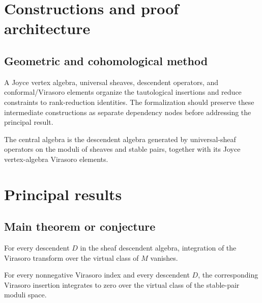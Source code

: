 \chapter{Constructions and proof architecture}
\label{chap:virasoro-constraints-moduli-sheaves-vertex-algebras-method}

\section{Geometric and cohomological method}
\label{sec:virasoro-constraints-moduli-sheaves-vertex-algebras-method}

A Joyce vertex algebra, universal sheaves, descendent operators, and conformal/Virasoro elements organize the tautological insertions and reduce constraints to rank-reduction identities. The formalization should preserve these intermediate constructions
as separate dependency nodes before addressing the principal result.

\begin{definition}
\label{virasoro-constraints-moduli-sheaves-vertex-algebras-central-object}
The central algebra is the descendent algebra generated by universal-sheaf operators on the moduli of sheaves and stable pairs, together with its Joyce vertex-algebra Virasoro elements.
\notready
\end{definition}

\chapter{Principal results}
\label{chap:virasoro-constraints-moduli-sheaves-vertex-algebras-results}

\section{Main theorem or conjecture}
\label{sec:virasoro-constraints-moduli-sheaves-vertex-algebras-results}

\begin{conjecture}
\label{virasoro-constraints-moduli-sheaves-vertex-algebras-main}
For every descendent $D$ in the sheaf descendent algebra, integration of the Virasoro transform over the virtual class of $M$ vanishes.
\notready
\end{conjecture}

\begin{conjecture}
\label{virasoro-constraints-moduli-sheaves-vertex-algebras-secondary}
For every nonnegative Virasoro index and every descendent $D$, the corresponding Virasoro insertion integrates to zero over the virtual class of the stable-pair moduli space.
\notready
\end{conjecture}
